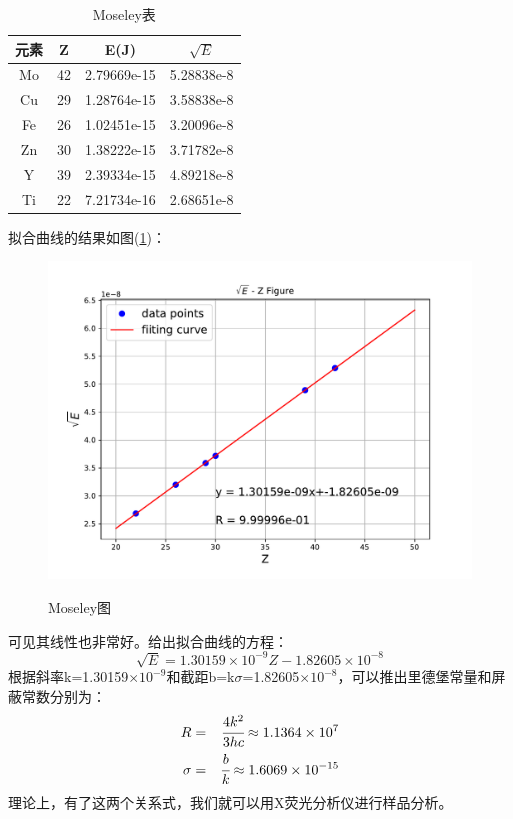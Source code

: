 \documentclass[a4paper]{article}
\begin{document}
\begin{enumerate}
\begin{table}[!h]
\caption{Moseley表}
\label{Moseley表}
\begin{tabular}{|c|c|c|c|}
\hline
元素 & Z  & E(J)        & $\sqrt{E}$ \\ \hline
Mo & 42 & 2.79669e-15 & 5.28838e-8 \\ \hline
Cu & 29 & 1.28764e-15 & 3.58838e-8 \\ \hline
Fe & 26 & 1.02451e-15 & 3.20096e-8 \\ \hline
Zn & 30 & 1.38222e-15 & 3.71782e-8 \\ \hline
Y  & 39 & 2.39334e-15 & 4.89218e-8 \\ \hline
Ti & 22 & 7.21734e-16 & 2.68651e-8 \\ \hline
\end{tabular}
\end{table}
拟合曲线的结果如图(\ref{MeseleyFig})：
\begin{figure}[!h]
\centering
\includegraphics[width=12cm]{fig/sqE_Z.pdf}\\
\caption{Moseley图}\label{MeseleyFig}
\end{figure}
可见其线性也非常好。给出拟合曲线的方程：
\begin{equation}
\sqrt{E} = 1.30159\times 10^{-9} Z - 1.82605\times 10^{-8}\label{Z_sqEEqn}
\end{equation}
根据斜率k=1.30159$\times 10^{-9}$和截距b=k$\sigma$=1.82605$\times 10^{-8}$，可以推出里德堡常量和屏蔽常数分别为：
\begin{eqnarray}
R &=& \cfrac{4k^2}{3hc} \approx 1.1364\times 10^{7}\\
\sigma &=& \cfrac{b}{k} \approx 1.6069\times 10^{-15}
\end{eqnarray}
理论上，有了这两个关系式，我们就可以用X荧光分析仪进行样品分析。

\end{enumerate}
\end{document}
